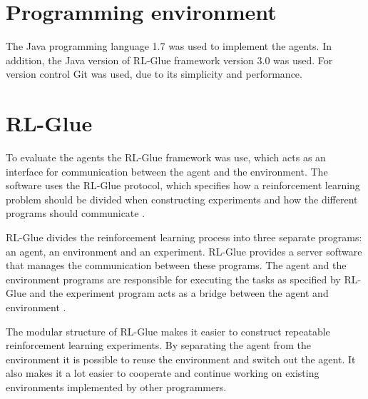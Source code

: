 \section{Programming environment}
\label{sec:prog_env}

The Java programming language 1.7 was used to implement the agents. In addition, the
Java version of RL-Glue framework version 3.0 was used. For version control Git
was used, due to its simplicity and performance.

\section{RL-Glue}
\label{sec:rl_glue}

To evaluate the agents the RL-Glue framework was use, which acts as an
interface for communication between the agent and the environment. The software
uses the RL-Glue protocol, which specifies how a reinforcement learning problem
should be divided when constructing experiments and how the different programs
should communicate \parencite{tanner2009rl}.

RL-Glue divides the reinforcement learning process into three separate
programs: an agent, an environment and an experiment. RL-Glue provides a server
software that manages the communication between these programs. The agent and
the environment programs are responsible for executing the tasks as specified
by RL-Glue and the experiment program acts as a bridge between the agent and
environment \parencite{tanner2009rl}.

The modular structure of RL-Glue makes it easier to construct repeatable
reinforcement learning experiments. By separating the agent from the
environment it is possible to reuse the environment and switch out the agent.
It also makes it a lot easier to cooperate and continue working on existing
environments implemented by other programmers.